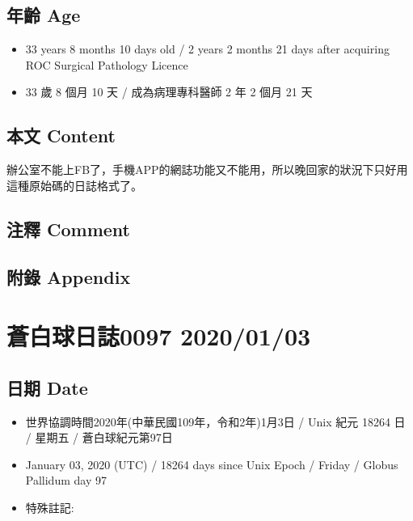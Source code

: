 \documentclass[
]{article}
\providecommand{\tightlist}{%
  \setlength{\itemsep}{0pt}\setlength{\parskip}{0pt}}
\begin{document}
\hypertarget{ux5e74ux9f61-age-32}{%
\subsection{年齡 Age}\label{ux5e74ux9f61-age-32}}

\begin{itemize}
\tightlist
\item
  33 years 8 months 10 days old / 2 years 2 months 21 days after
  acquiring ROC Surgical Pathology Licence
\item
  33 歲 8 個月 10 天 / 成為病理專科醫師 2 年 2 個月 21 天
\end{itemize}

\hypertarget{ux672cux6587-content-32}{%
\subsection{本文 Content}\label{ux672cux6587-content-32}}

辦公室不能上FB了，手機APP的網誌功能又不能用，所以晚回家的狀況下只好用這種原始碼的日誌格式了。

\hypertarget{ux6ce8ux91cb-comment-31}{%
\subsection{注釋 Comment}\label{ux6ce8ux91cb-comment-31}}

\hypertarget{ux9644ux9304-appendix-32}{%
\subsection{附錄 Appendix}\label{ux9644ux9304-appendix-32}}

\hypertarget{ux84bcux767dux7403ux65e5ux8a8c0097-20200103}{%
\section{蒼白球日誌0097
2020/01/03}\label{ux84bcux767dux7403ux65e5ux8a8c0097-20200103}}

\hypertarget{ux65e5ux671f-date-33}{%
\subsection{日期 Date}\label{ux65e5ux671f-date-33}}

\begin{itemize}
\tightlist
\item
  世界協調時間2020年(中華民國109年，令和2年)1月3日 / Unix 紀元 18264 日
  / 星期五 / 蒼白球紀元第97日
\item
  January 03, 2020 (UTC) / 18264 days since Unix Epoch / Friday / Globus
  Pallidum day 97
\item
  特殊註記:
\end{itemize}
\end{document}
